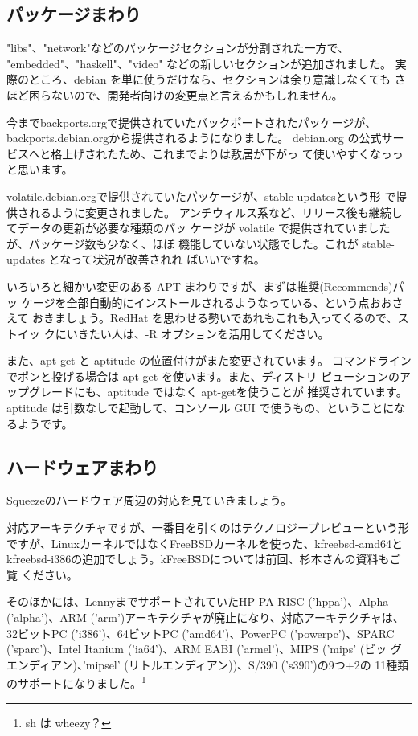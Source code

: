 \documentclass[mingoth,a4paper]{jsarticle}
\begin{document}
\subsection{パッケージまわり}

"libs"、"network"などのパッケージセクションが分割された一方で、
"embedded"、"haskell"、"video" などの新しいセクションが追加されました。
実際のところ、debian を単に使うだけなら、セクションは余り意識しなくても
さほど困らないので、開発者向けの変更点と言えるかもしれません。

今までbackports.orgで提供されていたバックポートされたパッケージが、
backports.debian.orgから提供されるようになりました。
debian.org の公式サービスへと格上げされたため、これまでよりは敷居が下がっ
て使いやすくなっっと思います。

volatile.debian.orgで提供されていたパッケージが、stable-updatesという形
で提供されるように変更されました。
アンチウィルス系など、リリース後も継続してデータの更新が必要な種類のパッ
ケージが volatile で提供されていましたが、パッケージ数も少なく、ほぼ
機能していない状態でした。これが stable-updates となって状況が改善されれ
ばいいですね。

いろいろと細かい変更のある APT まわりですが、まずは推奨(Recommends)パッ
ケージを全部自動的にインストールされるようなっている、という点おおさえて
おきましょう。RedHat を思わせる勢いであれもこれも入ってくるので、ストイッ
クにいきたい人は、-R オプションを活用してください。

また、apt-get と aptitude の位置付けがまた変更されています。
コマンドラインでポンと投げる場合は apt-get を使います。また、ディストリ
ビューションのアップグレードにも、aptitude ではなく apt-getを使うことが
推奨されています。
aptitude は引数なしで起動して、コンソール GUI で使うもの、ということにな
るようです。

\subsection{ハードウェアまわり}

Squeezeのハードウェア周辺の対応を見ていきましょう。

対応アーキテクチャですが、一番目を引くのはテクノロジープレビューという形
ですが、LinuxカーネルではなくFreeBSDカーネルを使った、kfreebsd-amd64と
kfreebsd-i386の追加でしょう。kFreeBSDについては前回、杉本さんの資料もご覧
ください。

そのほかには、LennyまでサポートされていたHP PA-RISC ('hppa')、Alpha
('alpha')、ARM ('arm')アーキテクチャが廃止になり、対応アーキテクチャは、
32ビットPC ('i386')、64ビットPC ('amd64')、PowerPC ('powerpc')、SPARC
('sparc')、Intel Itanium ('ia64')、ARM EABI ('armel')、MIPS ('mips' (ビッ
グエンディアン)、'mipsel' (リトルエンディアン))、S/390 ('s390')の9つ+2の
11種類のサポートになりました。\footnote{sh は wheezy？}
\end{document}
